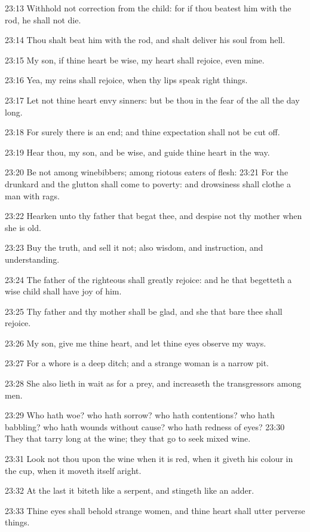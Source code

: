 23:13 Withhold not correction from the child: for if thou beatest him with the rod, he shall not die.

23:14 Thou shalt beat him with the rod, and shalt deliver his soul from hell.

23:15 My son, if thine heart be wise, my heart shall rejoice, even mine.

23:16 Yea, my reins shall rejoice, when thy lips speak right things.

23:17 Let not thine heart envy sinners: but be thou in the fear of the \LORD all the day long.

23:18 For surely there is an end; and thine expectation shall not be cut off.

23:19 Hear thou, my son, and be wise, and guide thine heart in the way.

23:20 Be not among winebibbers; among riotous eaters of flesh: 23:21 For the drunkard and the glutton shall come to poverty: and drowsiness shall clothe a man with rags.

23:22 Hearken unto thy father that begat thee, and despise not thy mother when she is old.

23:23 Buy the truth, and sell it not; also wisdom, and instruction, and understanding.

23:24 The father of the righteous shall greatly rejoice: and he that begetteth a wise child shall have joy of him.

23:25 Thy father and thy mother shall be glad, and she that bare thee shall rejoice.

23:26 My son, give me thine heart, and let thine eyes observe my ways.

23:27 For a whore is a deep ditch; and a strange woman is a narrow pit.

23:28 She also lieth in wait as for a prey, and increaseth the transgressors among men.

23:29 Who hath woe? who hath sorrow? who hath contentions? who hath babbling? who hath wounds without cause? who hath redness of eyes?  23:30 They that tarry long at the wine; they that go to seek mixed wine.

23:31 Look not thou upon the wine when it is red, when it giveth his colour in the cup, when it moveth itself aright.

23:32 At the last it biteth like a serpent, and stingeth like an adder.

23:33 Thine eyes shall behold strange women, and thine heart shall utter perverse things.

